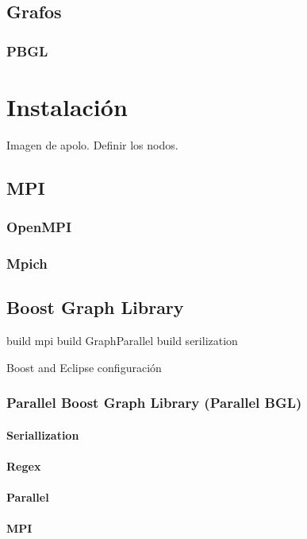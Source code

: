 \documentclass[twoside,letterpaper,12pt]{report}
\begin{document}
\section{Grafos}
\subsection{PBGL}


\chapter{Instalación}



Imagen de apolo.
Definir los nodos.

\section{MPI}

\subsection{OpenMPI}
\subsection{Mpich}

\section{Boost Graph Library}

	build mpi
	build GraphParallel
	build serilization

Boost and Eclipse
	configuración
	
\subsection{Parallel Boost Graph Library (Parallel BGL) }
\subsubsection{Seriallization}
\subsubsection{Regex}
\subsubsection{Parallel}
\subsubsection{MPI}
\end{document}
